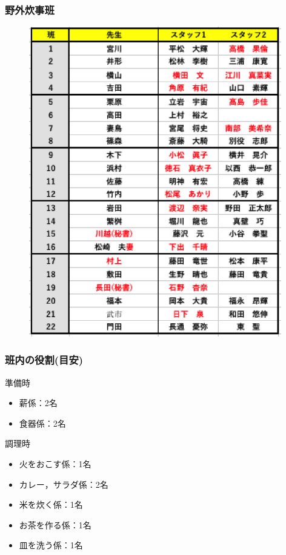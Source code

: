 \subsubsection{野外炊事班}
\begin{figure}[H]
\begin{center}
\includegraphics[width = 11cm]{./09/yagaisuijihanwake.eps}
\end{center}
\end{figure}


\subsubsection{班内の役割(目安)}

準備時
\begin{itemize}
  \item 薪係：2名
  \item 食器係：2名
\end{itemize}

調理時
\begin{itemize}
  \item 火をおこす係：1名
  \item カレー，サラダ係：2名
  \item 米を炊く係：1名
  \item お茶を作る係：1名
  \item 皿を洗う係：1名
\end{itemize}



